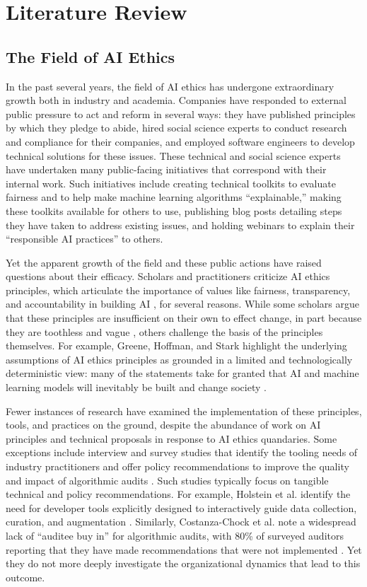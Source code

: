 \documentclass[sigconf]{acmart}
\begin{document}
\section{Literature Review}
\subsection{The Field of AI Ethics}
In the past several years, the field of AI ethics has undergone extraordinary growth both in industry and academia. Companies have responded to external public pressure to act and reform in several ways: they have published principles by which they pledge to abide, hired social science experts to conduct research and compliance for their companies, and employed software engineers to develop technical solutions for these issues. These technical and social science experts have undertaken many public-facing initiatives that correspond with their internal work. Such initiatives include creating technical toolkits to evaluate fairness and to help make machine learning algorithms “explainable,” making these toolkits available for others to use, publishing blog posts detailing steps they have taken to address existing issues, and holding webinars to explain their “responsible AI practices” to others. 

Yet the apparent growth of the field and these public actions have raised questions about their efficacy. Scholars and practitioners criticize AI ethics principles, which articulate the importance of values like fairness, transparency, and accountability in building AI \cite{fjeld_principled_2020}, for several reasons. While some scholars argue that these principles are insufficient on their own to effect change, in part because they are toothless and vague \cite{mittelstadt_principles_2019,munn_uselessness_2022}, others challenge the basis of the principles themselves. For example, Greene, Hoffman, and Stark highlight the underlying assumptions of AI ethics principles as grounded in a limited and technologically deterministic view: many of the statements take for granted that AI and machine learning models will inevitably be built and change society \cite{greene_better_2019}. 

Fewer instances of research have examined the implementation of these principles, tools, and practices on the ground, despite the abundance of work on AI principles and technical proposals in response to AI ethics quandaries. Some exceptions include interview and survey studies that identify the tooling needs of industry practitioners \cite{holstein_improving_2019} and offer policy recommendations to improve the quality and impact of algorithmic audits \cite{costanza-chock_who_2022}. Such studies typically focus on tangible technical and policy recommendations. For example, Holstein et al. identify the need for developer tools explicitly designed to interactively guide data collection, curation, and augmentation \cite{holstein_improving_2019}. Similarly, Costanza-Chock et al. note a widespread lack of “auditee buy in” for algorithmic audits, with 80\% of surveyed auditors reporting that they have made recommendations that were not implemented \cite{costanza-chock_who_2022}. Yet they do not more deeply investigate the organizational dynamics that lead to this outcome.
\end{document}
